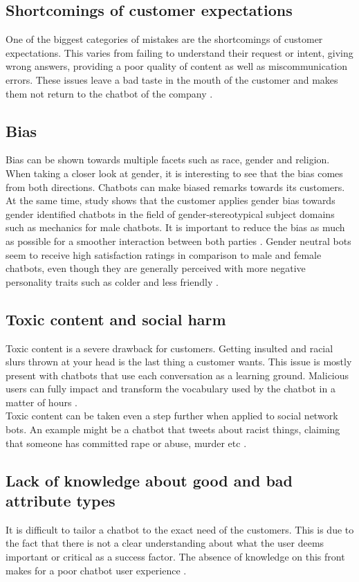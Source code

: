 \subsection{Shortcomings of customer expectations}
One of the biggest categories of mistakes are the shortcomings of customer expectations. This varies from failing to understand their request or intent, giving wrong answers, providing a poor quality of content as well as miscommunication errors. These issues leave a bad taste in the mouth of the customer and makes them not return to the chatbot of the company \citep{Adamopoulou2020, Duka2021, Nichifor2021, Sheehan2020, Margot}.

\subsection{Bias}
Bias can be shown towards multiple facets such as race, gender and religion. When taking a closer look at gender, it is interesting to see that the bias comes from both directions. Chatbots can make biased remarks towards its customers. At the same time, study shows that the customer applies gender bias towards gender identified chatbots in the field of gender-stereotypical subject domains such as mechanics for male chatbots. It is important to reduce the bias as much as possible for a smoother interaction between both parties \citep*{Adamopoulou2020, McDonnell2019}. Gender neutral bots seem to receive high satisfaction ratings in comparison to male and female chatbots, even though they are generally perceived with more negative personality traits such as colder and less friendly \citep{McDonnell2019}.

\subsection{Toxic content and social harm}
Toxic content is a severe drawback for customers. Getting insulted and racial slurs thrown at your head is the last thing a customer wants. This issue is mostly present with chatbots that use each conversation as a learning ground. Malicious users can fully impact and transform the vocabulary used by the chatbot in a matter of hours \citep{Adamopoulou2020}.\\
Toxic content can be taken even a step further when applied to social network bots. An example might be a chatbot that tweets about racist things, claiming that someone has committed rape or abuse, murder etc \citep{Radziwil2021}.

\subsection{Lack of knowledge about good and bad attribute types}
It is difficult to tailor a chatbot to the exact need of the customers. This is due to the fact that there is not a clear understanding about what the user deems important or critical as a success factor. The absence of knowledge on this front makes for a poor chatbot user experience \citep{brandtzaeg2020}.

